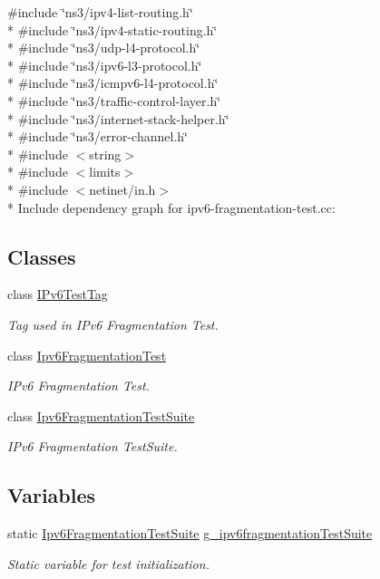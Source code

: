 {\ttfamily \#include \char`\"{}ns3/ipv4-\/list-\/routing.\+h\char`\"{}}\\*
{\ttfamily \#include \char`\"{}ns3/ipv4-\/static-\/routing.\+h\char`\"{}}\\*
{\ttfamily \#include \char`\"{}ns3/udp-\/l4-\/protocol.\+h\char`\"{}}\\*
{\ttfamily \#include \char`\"{}ns3/ipv6-\/l3-\/protocol.\+h\char`\"{}}\\*
{\ttfamily \#include \char`\"{}ns3/icmpv6-\/l4-\/protocol.\+h\char`\"{}}\\*
{\ttfamily \#include \char`\"{}ns3/traffic-\/control-\/layer.\+h\char`\"{}}\\*
{\ttfamily \#include \char`\"{}ns3/internet-\/stack-\/helper.\+h\char`\"{}}\\*
{\ttfamily \#include \char`\"{}ns3/error-\/channel.\+h\char`\"{}}\\*
{\ttfamily \#include $<$string$>$}\\*
{\ttfamily \#include $<$limits$>$}\\*
{\ttfamily \#include $<$netinet/in.\+h$>$}\\*
Include dependency graph for ipv6-\/fragmentation-\/test.cc\+:
\subsection*{Classes}
\begin{DoxyCompactItemize}
\item 
class \hyperlink{classIPv6TestTag}{I\+Pv6\+Test\+Tag}
\begin{DoxyCompactList}\small\item\em Tag used in I\+Pv6 Fragmentation Test. \end{DoxyCompactList}\item 
class \hyperlink{classIpv6FragmentationTest}{Ipv6\+Fragmentation\+Test}
\begin{DoxyCompactList}\small\item\em I\+Pv6 Fragmentation Test. \end{DoxyCompactList}\item 
class \hyperlink{classIpv6FragmentationTestSuite}{Ipv6\+Fragmentation\+Test\+Suite}
\begin{DoxyCompactList}\small\item\em I\+Pv6 Fragmentation Test\+Suite. \end{DoxyCompactList}\end{DoxyCompactItemize}
\subsection*{Variables}
\begin{DoxyCompactItemize}
\item 
static \hyperlink{classIpv6FragmentationTestSuite}{Ipv6\+Fragmentation\+Test\+Suite} \hyperlink{ipv6-fragmentation-test_8cc_a470dba9e3fce9bb43c90a0306c654f90}{g\+\_\+ipv6fragmentation\+Test\+Suite}
\begin{DoxyCompactList}\small\item\em Static variable for test initialization. \end{DoxyCompactList}\end{DoxyCompactItemize}


